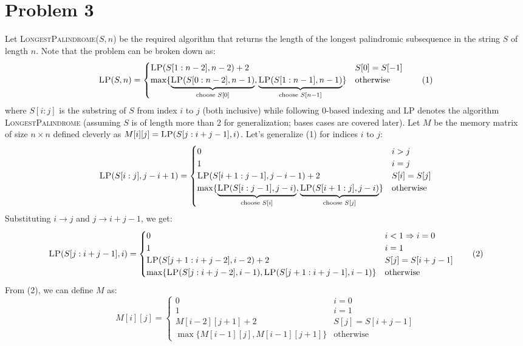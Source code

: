 \documentclass{article}
\begin{document}
\section{Problem 3}
  Let \textsc{LongestPalindrome}($S, n$) be the required algorithm that returns the length of the longest palindromic subsequence in the string $S$ of length $n$.
  Note that the problem can be broken down as:
  \[
    \textsc{LP}(S, n) =
    \begin{cases}
      \textsc{LP}(S[1:n-2], n-2) + 2 & S[0] = S[-1] \\
      \max\{
        \underbrace{\textsc{LP}(S[0:n-2], n-1)}_{\text{choose } S[0]},
        \underbrace{\textsc{LP}(S[1:n-1], n-1)}_{\text{choose } S[n - 1]}
      \}
        & \text{otherwise}
    \end{cases}
    \tag{1}
  \]
  where $S[i:j]$ is the substring of $S$ from index $i$ to $j$ (both inclusive) while following 0-based indexing and \textsc{LP} denotes the algorithm \textsc{LongestPalindrome} (assuming $S$ is of length more than 2 for generalization; bases cases are covered later).
  Let $M$ be the memory matrix of size $n \times n$ defined cleverly as $M[i][j] = \textsc{LP}(S[j:i+j-1], i)$.
  Let's generalize (1) for indices $i$ to $j$:
  \[
    \textsc{LP}(S[i:j], j-i+1) =
    \begin{cases}
      0 & i > j \\
      1 & i = j \\
      \textsc{LP}(S[i+1:j-1], j-i-1) + 2 & S[i] = S[j] \\
      \max\{
        \underbrace{\textsc{LP}(S[i:j-1], j-i)}_{\text{choose } S[i]},
        \underbrace{\textsc{LP}(S[i+1:j], j-i)}_{\text{choose } S[j]}
      \}
        & \text{otherwise}
    \end{cases}
  \]
  Substituting $i \to j$ and $j \to i + j - 1$, we get:
  \[
    \textsc{LP}(S[j:i+j-1], i) =
    \begin{cases}
      0 & i < 1 \Rightarrow i = 0 \\
      1 & i = 1 \\
      \textsc{LP}(S[j+1:i+j-2], i-2) + 2 & S[j] = S[i+j-1] \\
      \max\{\textsc{LP}(S[j:i+j-2], i-1), \textsc{LP}(S[j+1:i+j-1], i-1)\} & \text{otherwise}
    \end{cases}
    \tag{2}
  \]
  From (2), we can define $M$ as:
  \[
    M[i][j] =
    \begin{cases}
      0 & i = 0 \\
      1 & i = 1 \\
      M[i-2][j+1] + 2 & S[j] = S[i+j-1] \\
      \max\{M[i-1][j], M[i-1][j+1]\} & \text{otherwise}
    \end{cases}
  \]
\end{document}

